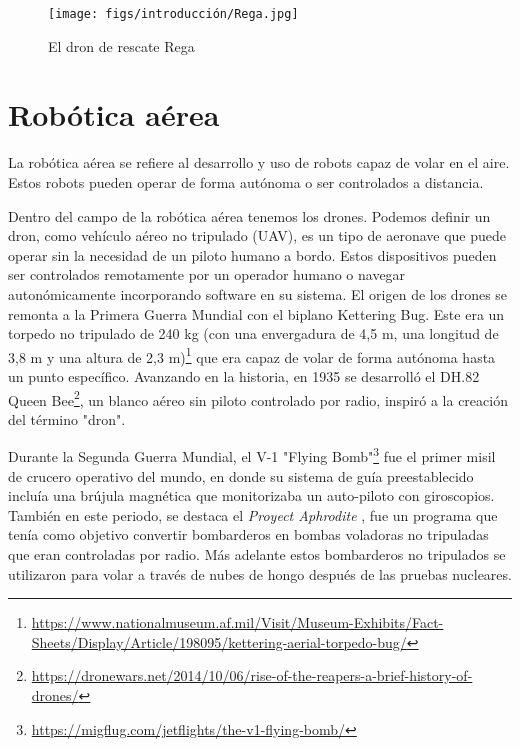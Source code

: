 \begin{figure} [H]
  \begin{center}
    \texttt{[image: figs/introducción/Rega.jpg]}
  \end{center}
  \caption{El dron de rescate Rega}
  \label{fig:Rega}
  \vspace{-1.5em}
\end{figure}

\section{Robótica aérea}
\label{sec:subseccion}
La robótica aérea se refiere al desarrollo y uso de robots capaz de volar en el aire. Estos robots pueden operar de forma autónoma o ser controlados a distancia.

Dentro del campo de la robótica aérea tenemos los drones. Podemos definir un dron, como vehículo aéreo no tripulado (UAV), es un tipo de aeronave que puede operar sin la 
necesidad de un piloto humano a bordo. Estos dispositivos pueden ser controlados remotamente por un operador humano o navegar autonómicamente incorporando software 
en su sistema. 
El origen de los drones se remonta a la Primera Guerra Mundial con el biplano Kettering Bug.
Este era un torpedo no tripulado de 240 kg (con una envergadura de 4,5 m, una longitud de
3,8 m y una altura de 2,3 m)\footnote{\url{https://www.nationalmuseum.af.mil/Visit/Museum-Exhibits/Fact-Sheets/Display/Article/198095/kettering-aerial-torpedo-bug/}} que era capaz 
de volar de forma autónoma hasta un punto específico. 
Avanzando en la historia, en 1935 se desarrolló el DH.82 Queen Bee\footnote{\url{https://dronewars.net/2014/10/06/rise-of-the-reapers-a-brief-history-of-drones/}}, un blanco aéreo
sin piloto controlado por radio, inspiró a la creación del término "dron". 

Durante la Segunda Guerra Mundial, el V-1 "Flying Bomb"\footnote{\url{https://migflug.com/jetflights/the-v1-flying-bomb/}} fue el primer misil
de crucero operativo del mundo, en donde su sistema de guía preestablecido incluía una brújula magnética que monitorizaba un auto-piloto con giroscopios. También en este periodo, se destaca el \textit{Proyect Aphrodite} \cite{Aphrodite}, 
fue un programa que tenía como objetivo convertir bombarderos en bombas voladoras no tripuladas que eran controladas por radio. Más adelante estos bombarderos no tripulados se utilizaron para volar a través de nubes de hongo
después de las pruebas nucleares. 

